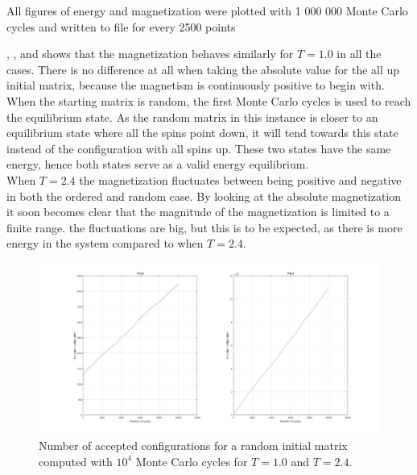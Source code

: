 \documentclass[10pt,a4paper]{article}
\begin{document}
\noindent All figures of energy and magnetization were plotted with 1 000 000 Monte Carlo cycles and written to file for every 2500 points 







 





\noindent {}, ,  and  shows that the magnetization behaves similarly for $T=1.0$ in all the cases. There is no difference at all when taking the absolute value for the all up initial matrix, because the magnetism is continuously positive to begin with. When the starting matrix is random, the first Monte Carlo cycles is used to reach the equilibrium state. As the random matrix in this instance is closer to an equilibrium state where all the spins point down, it will tend towards this state instead of the configuration with all spins up. These two states have the same energy, hence both states serve as a valid energy equilibrium. \\

\noindent When $T=2.4$ the magnetization fluctuates between being positive and negative in both the ordered and random case. By looking at the absolute magnetization it soon becomes clear that the magnitude of the magnetization is limited to a finite range. the fluctuations are big, but this is to be expected, as there is more energy in the system compared to when $T=2.4$. 

\begin{figure} [H]
\centerline{
\includegraphics[scale=0.245]{randomaccept.jpg}
}
\caption{Number of accepted configurations for a random initial matrix computed with $10^4$ Monte Carlo cycles for $T=1.0$ and $T=2.4$.}
\label{fig:RandomAccept}
\end{figure}
\end{document}
